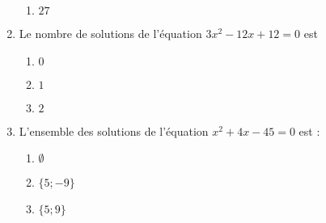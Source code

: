 \documentclass[oneside,twocolumn,landscape]{book}
\begin{document}
\begin{enumerate}
\begin{enumerate}
\item\MauvaiseReponse $27$

\end{enumerate}



\item Le nombre de solutions de l'équation $3x^{2}-12 x+12=0$ est

\begin{enumerate}

\item\MauvaiseReponse $0$

\item\BonneReponse $1$

\item\MauvaiseReponse $2$

\end{enumerate}




\item L'ensemble des solutions de l'équation $x^{2}+4 x-45=0$ est :

\begin{enumerate}

\item\MauvaiseReponse $\emptyset$

\item\BonneReponse $\{5 ;-9\}$

\item\MauvaiseReponse $\{5 ; 9\}$

\end{enumerate}



\end{enumerate}
\end{document}
